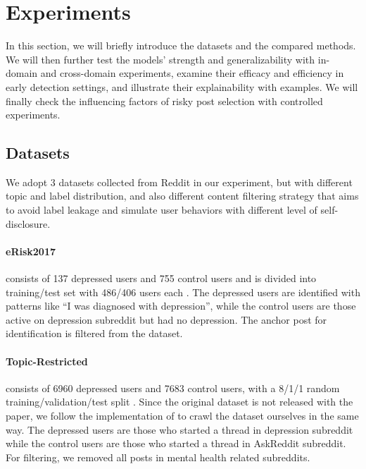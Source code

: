\section{Experiments}

In this section, we will briefly introduce the datasets and the compared methods. We will then further test the models' strength and generalizability with in-domain and cross-domain experiments, examine their efficacy and efficiency in early detection settings, and illustrate their explainability with examples. We will finally check the influencing factors of risky post selection with controlled experiments.

\subsection{Datasets}

We adopt 3 datasets collected from Reddit in our experiment, but with different topic and label distribution, and also different content filtering strategy that aims to avoid label leakage and simulate user behaviors with different level of self-disclosure.

\paragraph{eRisk2017} consists of 137 depressed users and 755 control users and is divided into training/test set with 486/406 users each \citep{losada2016test}. The depressed users are identified with patterns like ``I was diagnosed with depression'', while the control users are those active on depression subreddit but had no depression. The anchor post for identification is filtered from the dataset.

\paragraph{Topic-Restricted} consists of 6960 depressed users and 7683 control users, with a 8/1/1 random training/validation/test split \citep{wolohan2018detecting}. Since the original dataset is not released with the paper, we follow the implementation of \citet{harrigian2020models} to crawl the dataset ourselves in the same way. The depressed users are those who started a thread in depression subreddit while the control users are those who started a thread in AskReddit subreddit. For filtering, we removed all posts in mental health related subreddits.

